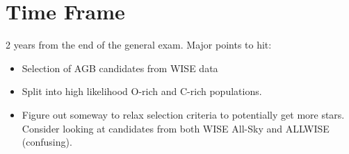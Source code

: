 \section{Time Frame}
2 years from the end of the general exam.
Major points to hit:
\begin{itemize}
\item Selection of AGB candidates from WISE data
\item Split into high likelihood O-rich and C-rich populations.
\item Figure out someway to relax selection criteria to potentially get more stars.  Consider looking at candidates from both WISE All-Sky and ALLWISE (confusing).
\end{itemize}